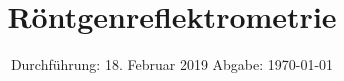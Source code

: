 

\subject{VERSUCH NUMMER 65}
\title{Röntgenreflektrometrie}
\date{
  Durchführung: 18. Februar 2019
  \hspace{3em}
  Abgabe: \today
}



\maketitle
\thispagestyle{empty}
\tableofcontents
\newpage






\printbibliography


